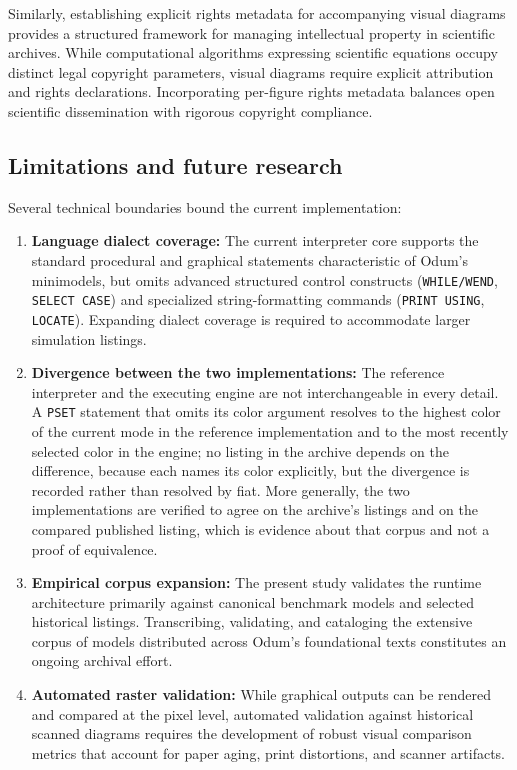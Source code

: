 \documentclass[11pt,a4paper]{article}
\begin{document}
Similarly, establishing explicit rights metadata for accompanying visual diagrams provides a structured framework for managing intellectual property in scientific archives. While computational algorithms expressing scientific equations occupy distinct legal copyright parameters, visual diagrams require explicit attribution and rights declarations. Incorporating per-figure rights metadata balances open scientific dissemination with rigorous copyright compliance.

\subsection{Limitations and future research}

Several technical boundaries bound the current implementation:
\begin{enumerate}
\item \textbf{Language dialect coverage:} The current interpreter core supports the standard procedural and graphical statements characteristic of Odum's minimodels, but omits advanced structured control constructs (\texttt{WHILE/WEND}, \texttt{SELECT CASE}) and specialized string-formatting commands (\texttt{PRINT USING}, \texttt{LOCATE}). Expanding dialect coverage is required to accommodate larger simulation listings.
\item \textbf{Divergence between the two implementations:} The reference interpreter and the executing engine are not interchangeable in every detail. A \texttt{PSET} statement that omits its color argument resolves to the highest color of the current mode in the reference implementation and to the most recently selected color in the engine; no listing in the archive depends on the difference, because each names its color explicitly, but the divergence is recorded rather than resolved by fiat. More generally, the two implementations are verified to agree on the archive's listings and on the compared published listing, which is evidence about that corpus and not a proof of equivalence.
\item \textbf{Empirical corpus expansion:} The present study validates the runtime architecture primarily against canonical benchmark models and selected historical listings. Transcribing, validating, and cataloging the extensive corpus of models distributed across Odum's foundational texts \citep{odum1983,odumMinimodels,odumOdum2000} constitutes an ongoing archival effort.
\item \textbf{Automated raster validation:} While graphical outputs can be rendered and compared at the pixel level, automated validation against historical scanned diagrams requires the development of robust visual comparison metrics that account for paper aging, print distortions, and scanner artifacts.
\end{enumerate}
\end{document}
